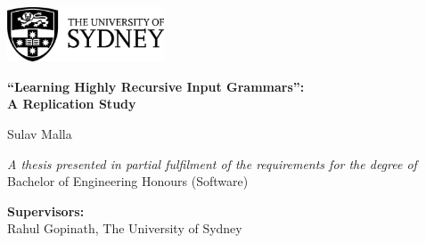 \begin{titlepage}
    \vspace*{1cm}

    \begin{flushleft}
        \begin{center}
            \includegraphics[width=0.35\textwidth]{img/pre_chapters/usyd_logo_full.png}
    
        \vspace{3cm} 
    
        {\LARGE \textbf{\enquote{Learning Highly Recursive Input Grammars}:\\[3pt]A Replication Study}}
    
        \vspace{1.5cm} 
        
        {\Large Sulav Malla} 


        

        \vfill
        
        \textit{A thesis presented in partial fulfilment of the requirements for the degree of\\[3pt]}
        Bachelor of Engineering Honours (Software)
        
        \vspace{2.75cm}
    
        \textbf{Supervisors:}\\
        Rahul Gopinath, The University of Sydney
    
        \vspace{0.8cm}


\end{center}
\end{flushleft}
\end{titlepage}
